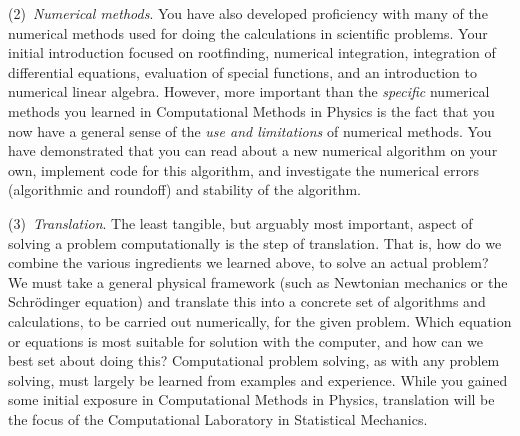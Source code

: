 \documentclass[12pt]{mcplain}
\begin{document}
(2)~\textit{Numerical methods}.  You have also developed proficiency with many
of the numerical methods used for doing the calculations in scientific problems.
Your initial introduction focused on rootfinding, numerical integration,
integration of differential equations, evaluation of special functions, and an
introduction to numerical linear algebra.  However, more important than the
\textit{specific} numerical methods you learned in Computational Methods in
Physics is the fact that you now have a general sense of the \textit{use and
limitations} of numerical methods.  You have demonstrated that you can read
about a new numerical algorithm on your own, implement code for this algorithm,
and investigate the numerical errors (algorithmic and roundoff) and stability of
the algorithm.

(3)~\textit{Translation}. The least tangible, but arguably most important,
aspect of solving a problem computationally is the step of translation. That is,
how do we combine the various ingredients we learned above, to solve an actual
problem? We must take a general physical framework (such as Newtonian mechanics
or the Schr\"odinger equation) and translate this into a concrete set of
algorithms and calculations, to be carried out numerically, for the given
problem. Which equation or equations is most suitable for solution with the
computer, and how can we best set about doing this? Computational problem
solving, as with any problem solving, must largely be learned from examples and
experience.  While you gained some initial exposure in Computational Methods in
Physics, translation will be the focus of the Computational Laboratory in
Statistical Mechanics.

\end{document}
